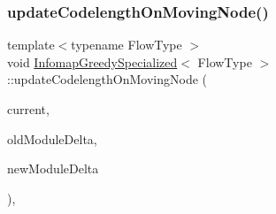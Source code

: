 \subsubsection{\texorpdfstring{update\+Codelength\+On\+Moving\+Node()}{updateCodelengthOnMovingNode()}}
{\footnotesize\ttfamily template$<$typename Flow\+Type $>$ \\
void \mbox{\hyperlink{classInfomapGreedySpecialized}{Infomap\+Greedy\+Specialized}}$<$ Flow\+Type $>$\+::update\+Codelength\+On\+Moving\+Node (\begin{DoxyParamCaption}\item[{\mbox{\hyperlink{classNode}{Node\+Type}} \&}]{current,  }\item[{\mbox{\hyperlink{structDeltaFlow}{Delta\+Flow}} \&}]{old\+Module\+Delta,  }\item[{\mbox{\hyperlink{structDeltaFlow}{Delta\+Flow}} \&}]{new\+Module\+Delta }\end{DoxyParamCaption})\hspace{0.3cm}{\ttfamily [inline]}, {\ttfamily [protected]}}

